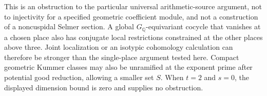 \begin{remark}
\label{rem:pro3-source-dimension-scope}
This is an obstruction to the particular universal arithmetic-source
argument, not to injectivity for a specified geometric coefficient
module, and not a construction of a noncuspidal Selmer section.
A global $G_{\mathbb Q}$-equivariant cocycle that vanishes at a chosen
place also has conjugate local restrictions constrained at the other
places above three.  Joint localization or an isotypic cohomology
calculation can therefore be stronger than the single-place argument
tested here.  Compact geometric Kummer classes may also be unramified
at the exponent prime after potential good reduction, allowing a
smaller set $S$.  When $t=2$ and $s=0$, the displayed dimension bound
is zero and supplies no obstruction.
\end{remark}
